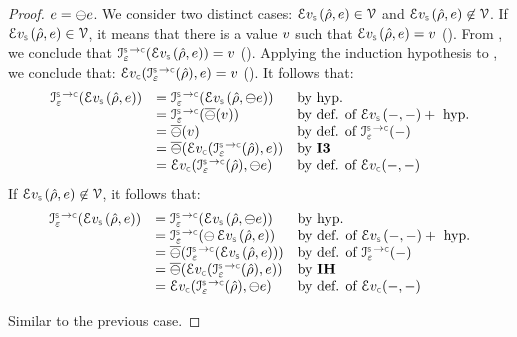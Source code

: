 \begin{proof}
\noindent {} $e = \ominus e$. We consider two distinct cases: 
$\evalexpr{\symbolic}(\sstore, \jsilexpr) \in \vals$ and $\evalexpr{\symbolic}(\sstore, \jsilexpr) \not\in \vals$. 
If $\evalexpr{\symbolic}(\sstore, \jsilexpr) \in \vals$, it means that there is a value $v$ such 
that  $\evalexpr{\symbolic}(\sstore, \jsilexpr) = \val$ (). From , we conclude that 
$\interpret{\symbconc}{\senv}(\evalexpr{\symbolic}(\sstore, \jsilexpr)) = \val$ (). 
Applying the induction hypothesis to , we conclude that: 
$\evalexpr{\concrete}(\interpret{\symbconc}{\senv}(\sstore), \jsilexpr) = \val$ (). 
It follows that: 
$$
\begin{array}{lll}
  \interpret{\symbconc}{\senv}(\evalexpr{\symbolic}(\sstore, \jsilexpr))  &
       =  \interpret{\symbconc}{\senv}(\evalexpr{\symbolic}(\sstore, \ominus \jsilexpr)) & \text{by hyp.} \\  & 
       =  \interpret{\symbconc}{\senv}(\semop{\ominus}(\val))  & \text{by def. of } \evalexpr{\symbolic}(-, -) + \text{ hyp.} \\ & 
       =  \semop{\ominus}(\val)   & \text{by def. of } \interpret{\symbconc}{\senv}(-) \\ &
       =  \semop{\ominus}(\evalexpr{\concrete}(\interpret{\symbconc}{\senv}(\sstore), \jsilexpr))   & \text{by \ieq{3}}\\ &
       = \evalexpr{\concrete}(\interpret{\symbconc}{\senv}(\sstore), \ominus \jsilexpr)  & \text{by def. of } \evalexpr{\concrete}(-, -) 
\end{array}
$$
If $\evalexpr{\symbolic}(\sstore, \jsilexpr) \not\in \vals$, it follows that: 
$$
\begin{array}{lll}
  \interpret{\symbconc}{\senv}(\evalexpr{\symbolic}(\sstore, \jsilexpr))  &
       =  \interpret{\symbconc}{\senv}(\evalexpr{\symbolic}(\sstore, \ominus \jsilexpr)) & \text{by hyp.} \\  & 
       =  \interpret{\symbconc}{\senv}(\ominus \, \evalexpr{\symbolic}(\sstore, \jsilexpr))  & \text{by def. of } \evalexpr{\symbolic}(-, -) + \text{ hyp.} \\ & 
       =  \semop{\ominus}(\interpret{\symbconc}{\senv}(\evalexpr{\symbolic}(\sstore, \jsilexpr)))   & \text{by def. of } \interpret{\symbconc}{\senv}(-) \\ &
       =  \semop{\ominus}(\evalexpr{\concrete}(\interpret{\symbconc}{\senv}(\sstore), \jsilexpr))   & \text{by \indhyp}\\ &
       = \evalexpr{\concrete}(\interpret{\symbconc}{\senv}(\sstore), \ominus \jsilexpr)  & \text{by def. of } \evalexpr{\concrete}(-, -) 
\end{array}
$$

\noindent {} Similar to the previous case. 
\end{proof}

